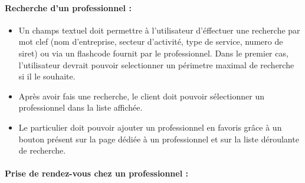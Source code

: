 \documentclass{article}
\begin{document}
\begin{itemize}
\paragraph{Recherche d'un professionnel :}
\begin{itemize}
\item Un champs textuel doit permettre à l'utilisateur d'éffectuer une
  recherche par mot clef (nom d'entreprise, secteur d'activité, type de service, numero de siret) ou via un flashcode fournit par le professionnel. Dans
  le premier cas, l'utilisateur devrait pouvoir selectionner
  un périmetre maximal de recherche si il le souhaite.
\item Après avoir fais une recherche, le client doit pouvoir sélectionner un
  professionnel dans la liste affichée.
\item Le particulier doit pouvoir ajouter un professionnel en favoris grâce
  à un bouton présent sur la page dédiée à un professionnel et sur la
  liste déroulante de recherche.


\end{itemize}

\paragraph{Prise de rendez-vous chez un professionnel :}
\begin{itemize}


\end{itemize}
\end{itemize}
\end{document}
